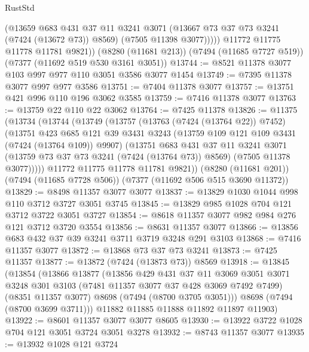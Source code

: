 \begin{lexlean}{RustStd}
\begin{coremodule}
{\begin{coremodule}
{{{{{{{{{{{{{{{{{{{{{{{{{{{{{{{{              (@13659
                @683
                @431
                @37
                @11
                @3241
                @3071
                (@13667 @73 @37 @73 @3241 (@7424 (@13672 @73)) @8569)
                (@7505 @11398 @3077)))))
        @11772
        @11775
        @11778
        @11781
        @9821))
    (@8280 (@11681 @213))
    (@7494 (@11685 @7727 @519))
    (@7377 (@11692 @519 @530 @3161 @3051))
@13744 := @8521 @11378 @3077 @103 @997 @977 @110 @3051 @3586 @3077 @1454
@13749 := @7395 @11378 @3077 @997 @977 @3586
@13751 := @7404 @11378 @3077
@13757 := @13751 @421 @996 @110 @196 @3062 @3585
@13759 := @7416 @11378 @3077
@13763 := @13759 @22 @110 @22 @3062
@13764 := @7425 @11378
@13826 := @11375
    (@13734
      (@13744
        (@13749
          (@13757
            (@13763 (@7424 (@13764 @22)) @7452)
            (@13751
              @423
              @685
              @121
              @39
              @3431
              @3243
              (@13759 @109 @121 @109 @3431 (@7424 (@13764 @109)) @9907)
              (@13751
                @683
                @431
                @37
                @11
                @3241
                @3071
                (@13759 @73 @37 @73 @3241 (@7424 (@13764 @73)) @8569)
                (@7505 @11378 @3077)))))
        @11772
        @11775
        @11778
        @11781
        @9821))
    (@8280 (@11681 @201))
    (@7494 (@11685 @7728 @506))
    (@7377 (@11692 @506 @515 @3690 @11372))
@13829 := @8498 @11357 @3077 @3077
@13837 := @13829 @1030 @1044 @998 @110 @3712 @3727 @3051 @3745
@13845 := @13829 @985 @1028 @704 @121 @3712 @3722 @3051 @3727
@13854 := @8618 @11357 @3077 @982 @984 @276 @121 @3712 @3720 @3554
@13856 := @8631 @11357 @3077
@13866 := @13856 @683 @432 @37 @39 @3241 @3711 @3719 @3248 @291 @3103
@13868 := @7416 @11357 @3077
@13872 := @13868 @73 @37 @73 @3241
@13873 := @7425 @11357
@13877 := @13872 (@7424 (@13873 @73)) @8569
@13918 := @13845
    (@13854
      (@13866
        @13877
        (@13856
          @429
          @431
          @37
          @11
          @3069
          @3051
          @3071
          @3248
          @301
          @3103
          (@7481 @11357 @3077 @37 @428 @3069 @7492 @7499)
          (@8351 @11357 @3077)
          @8698
          (@7494 (@8700 @3705 @3051)))
        @8698
        (@7494 (@8700 @3699 @3711)))
      @11882
      @11885
      @11888
      @11892
      @11897
      @11903)
@13922 := @8601 @11357 @3077 @3077 @8605
@13930 := @13922 @3722 @1028 @704 @121 @3051 @3724 @3051 @3278
@13932 := @8743 @11357 @3077
@13935 := @13932 @1028 @121 @3724
}}}}}}}}}}}}}}}}}}}}}}}}}}}}}}}}
\end{coremodule}}
\end{coremodule}
\end{lexlean}
